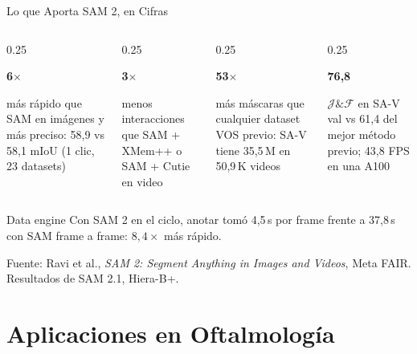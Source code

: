 \documentclass[aspectratio=169, 10pt]{beamer}
\newcommand{\cifra}[2]{%
	\begin{center}
		{\fontsize{30}{32}\selectfont\bfseries\color{UCMNavy}#1}\\[4pt]
		\parbox{0.95\linewidth}{\centering\small #2}
	\end{center}
}
\begin{document}
\begin{frame}{Lo que Aporta SAM 2, en Cifras}

	\vspace{0.2cm}

	\begin{columns}[T]
		\begin{column}{0.25\textwidth}
			\cifra{6$\times$}{m\'as r\'apido que SAM en im\'agenes y m\'as preciso: 58,9 vs 58,1 mIoU (1 clic, 23 datasets)}
		\end{column}
		\begin{column}{0.25\textwidth}
			\cifra{3$\times$}{menos interacciones que SAM + XMem++ o SAM + Cutie en video}
		\end{column}
		\begin{column}{0.25\textwidth}
			\cifra{53$\times$}{m\'as m\'ascaras que cualquier dataset VOS previo: SA-V tiene 35,5\,M en 50,9\,K videos}
		\end{column}
		\begin{column}{0.25\textwidth}
			\cifra{76,8}{$\mathcal{J}\&\mathcal{F}$ en SA-V val vs 61,4 del mejor m\'etodo previo; 43,8 FPS en una A100}
		\end{column}
	\end{columns}

	\vspace{0.3cm}

	\begin{alertblock}{Data engine}
		Con SAM 2 en el ciclo, anotar tom\'o 4,5\,s por frame frente a 37,8\,s con SAM frame a frame: $8{,}4\times$ m\'as r\'apido.
	\end{alertblock}

	\vspace{0.1cm}
	{\scriptsize Fuente: Ravi et al., \textit{SAM 2: Segment Anything in Images and Videos}, Meta FAIR. Resultados de SAM 2.1, Hiera-B+.}

\end{frame}

\section{Aplicaciones en Oftalmolog\'ia}
\end{document}

